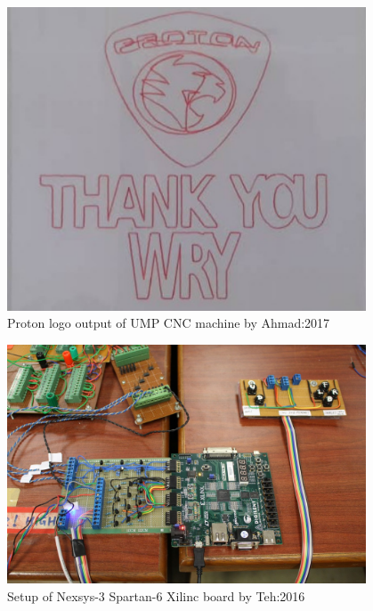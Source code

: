 \clearpage
\pagebreak

\begin{figure}
	\caption{Proton logo output of UMP CNC machine by Ahmad:2017}
	\label{Thank-You-WRY-Asyrul.png}
	\centering
	\includegraphics[width=0.95\textwidth]{Chap2/Images/Thank-You-WRY-Asyrul.png} 
\end{figure}

\begin{figure}
	\caption{Setup of Nexsys-3 Spartan-6 Xilinc board by Teh:2016}
	\label{Nexsys3-Spartan6-Xilinc-board.jpg}
	\centering
	\includegraphics[width=0.95\textwidth]{Chap2/Images/Nexsys3-Spartan6-Xilinc-board.jpg} 
\end{figure}

\clearpage
\pagebreak

